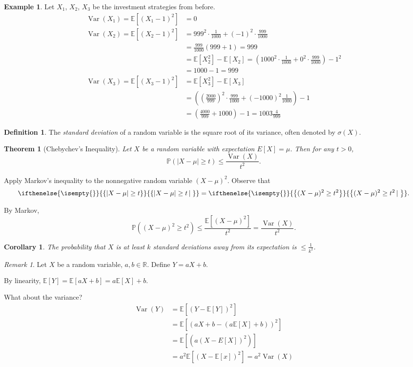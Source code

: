\documentclass[a4paper,11pt]{amsbook}
\makeatletter
\renewenvironment{proof}[1][\proofname]{\par
    \pushQED{\qed}%
    \normalfont \topsep6\p@\@plus6\p@\relax
    \trivlist
    \itemindent\z@ %
    \item[\hskip\labelsep
          \scshape
      #1\@addpunct{.}]\ignorespaces
}{%
    \popQED\endtrivlist\@endpefalse
}
\newtheorem{theorem}{\hspace{-2em} \color{darkblue} Theorem}[chapter]
\newtheorem{corollary}{\hspace{-2em} \color{darkblue} Corollary}[chapter]
\theoremstyle{definition}
\newtheorem{definition}{\hspace{-2em} \color{darkblue} Definition}[chapter]
\newtheorem{example}{\hspace{-2em} \color{darkblue} Example}[chapter]
\theoremstyle{remark}
\newtheorem{remark}{\hspace{-2em} \color{darkblue} Remark}[chapter]
\newcommand{\R}{\mathbb{R}}
\newcommand{\E}{\mathbb{E}}
\renewcommand{\P}{\mathbb{P}}
\DeclareMathOperator\Var{Var}
\newcommand\0{\varnothing}
\newcommand\set[2][]
{
    \ifthenelse{\isempty{#1}}
    {
        \left\{#2\right\}
    }
    {
        \left\{#2\left|\,#1\right.\right\}
    }
}
\makeatother
\begin{document}
    \begin{example}
        Let $X_1$, $X_2$, $X_3$ be  the investment strategies from before.
        \begin{align*}
            \Var(X_1)=\E[(X_1-1)^2]&=0 \\
            \Var(X_2)=\E[(X_2-1)^2]&=999^2\cdot\frac1{1000}+(-1)^2\cdot\frac{999}{1000} \\
            &=\frac{999}{1000}(999+1)=999 \\
            &=\E[X_2^2]-\E[X_2]=\left(1000^2\cdot\frac{1}{1000}+0^2\cdot\frac{999}{1000}\right)-1^2 \\
            &=1000-1=999 \\
            \Var(X_3)=\E[(X_3-1)^2]&=\E[X_3^2]-\E[X_3] \\
            &=\left(\left(\frac{2000}{999}\right)^2\cdot\frac{999}{1000}+(-1000)^2\frac{1}{1000}\right)-1 \\
            &=\left(\frac{4000}{999}+1000\right)-1=1003\frac{4}{999}
        \end{align*}
    \end{example}

    \begin{definition}
        The \emph{standard deviation} of a random variable is the square root of its variance, often denoted by $\sigma(X)$.
    \end{definition}

    \begin{theorem}[Chebychev's Inequality]{}
        Let $X$ be a random variable with expectation $E[X]=\mu$. Then for any $t>0$, $$\P(|X-\mu|\geq t)\leq\frac{\Var(X)}{t^2}.$$
    \end{theorem}
    \begin{proof}
        Apply Markov's inequality to the nonnegative random variable $(X-\mu)^2$. Observe that
        $$\set{|X-\mu|\geq t}=\set{(X-\mu)^2\geq t^2}.$$

        By Markov, $$\P((X-\mu)^2\geq t^2)\leq\frac{\E[(X-\mu)^2]}{t^2}=\frac{\Var(X)}{t^2}.$$
    \end{proof}

    \begin{corollary}
        The probability that $X$ is at least $k$ standard deviations away from its expectation is $\leq\frac{1}{k^2}$.
    \end{corollary}

    \begin{remark} 
        Let $X$ be a random variable, $a,b\in\R$. Define $Y=aX+b$.

        By linearity, $\E[Y]=\E[aX+b]=a\E[X]+b$.

        What about the variance?
        \begin{align*}
            \Var(Y)&=\E[(Y-\E[Y])^2] \\
            &=\E[(aX+b-(a\E[X]+b))^2] \\
            &=\E[(a(X-E[X])^2)] \\
            &=a^2\E[(X-\E[x])^2]=a^2\Var(X)
        \end{align*}
    \end{remark}
\end{document}
